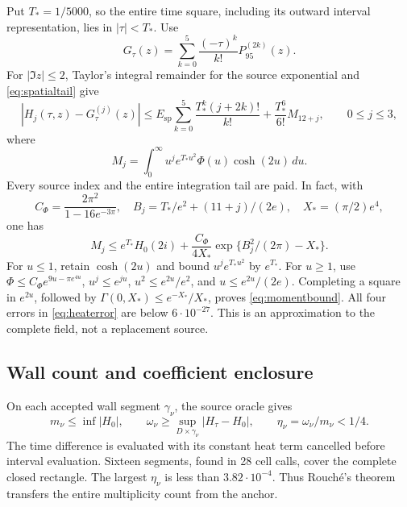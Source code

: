 Put \(T_*=1/5000\), so the entire time square, including its outward
interval representation, lies in \(|\tau|<T_*\). Use
\begin{equation}
 G_\tau(z)=\sum_{k=0}^{5}\frac{(-\tau)^k}{k!}P_{95}^{(2k)}(z).
 \label{eq:finiteheat}
\end{equation}
For \(|\Im z|\le2\), Taylor's integral remainder for the source
exponential and \eqref{eq:spatialtail} give
\begin{equation}
 |H_j(\tau,z)-G_\tau^{(j)}(z)|
 \le E_{\mathrm{sp}}\sum_{k=0}^{5}
       \frac{T_*^k(j+2k)!}{k!}
       +\frac{T_*^6}{6!}M_{12+j},\qquad 0\le j\le3,
 \label{eq:heaterror}
\end{equation}
where
\[
 M_j=\int_0^\infty u^je^{T_*u^2}\Phi(u)\cosh(2u)\,du.
\]
Every source index and the entire integration tail are paid. In fact,
with
\[
 C_\Phi=\frac{2\pi^2}{1-16e^{-3\pi}},\quad
 B_j=T_*/e^2+(11+j)/(2e),\quad X_*=(\pi/2)e^4,
\]
one has
\begin{equation}
 M_j\le e^{T_*}H_0(2i)+\frac{C_\Phi}{4X_*}
                   \exp\{B_j^2/(2\pi)-X_*\}.
 \label{eq:momentbound}
\end{equation}
For \(u\le1\), retain \(\cosh(2u)\) and bound \(u^je^{T_*u^2}\)
by \(e^{T_*}\). For \(u\ge1\), use
\(\Phi\le C_\Phi e^{9u-\pi e^{4u}}\), \(u^j\le e^{ju}\),
\(u^2\le e^{2u}/e^2\), and \(u\le e^{2u}/(2e)\).
Completing a square in \(e^{2u}\), followed by
\(\Gamma(0,X_*)\le e^{-X_*}/X_*\), proves \eqref{eq:momentbound}.
All four errors in \eqref{eq:heaterror} are below \(6\cdot10^{-27}\).
This is an approximation to the complete field, not a replacement source.

\subsection{Wall count and coefficient enclosure}
On each accepted wall segment \(\gamma_\nu\), the source oracle gives
\[
 m_\nu\le\inf|H_0|,\qquad
 \omega_\nu\ge\sup_{D\times\gamma_\nu}|H_\tau-H_0|,
 \qquad \eta_\nu=\omega_\nu/m_\nu<1/4.
\]
The time difference is evaluated with its constant heat term cancelled
before interval evaluation. Sixteen segments, found in 28 cell calls,
cover the complete closed rectangle. The largest \(\eta_\nu\) is less
than \(3.82\cdot10^{-4}\). Thus Rouch\'e's theorem transfers the
entire multiplicity count from the anchor.

